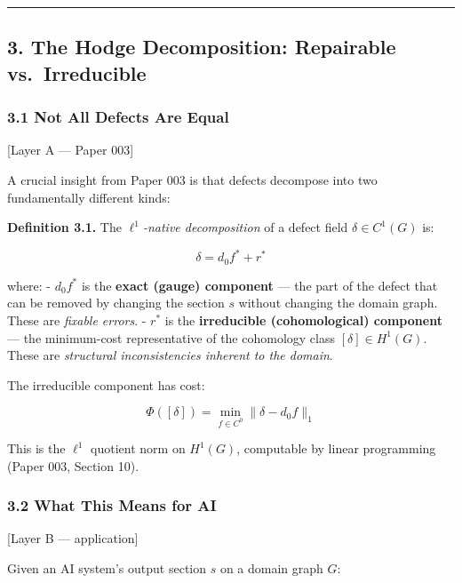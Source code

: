 \documentclass[
]{article}
\begin{document}
\begin{center}\rule{0.5\linewidth}{0.5pt}\end{center}

\subsection{3. The Hodge Decomposition: Repairable
vs.~Irreducible}\label{the-hodge-decomposition-repairable-vs.-irreducible}

\subsubsection{3.1 Not All Defects Are
Equal}\label{not-all-defects-are-equal}

{[}Layer A --- Paper 003{]}

A crucial insight from Paper 003 is that defects decompose into two
fundamentally different kinds:

\textbf{Definition 3.1.} The \emph{\(\ell^1\)-native decomposition} of a
defect field \(\delta \in C^1(G)\) is:

\[\delta = d_0 f^* + r^*\]

where: - \(d_0 f^*\) is the \textbf{exact (gauge) component} --- the
part of the defect that can be removed by changing the section \(s\)
without changing the domain graph. These are \emph{fixable errors}. -
\(r^*\) is the \textbf{irreducible (cohomological) component} --- the
minimum-cost representative of the cohomology class
\([\delta] \in H^1(G)\). These are \emph{structural inconsistencies
inherent to the domain}.

The irreducible component has cost:

\[\Phi([\delta]) = \min_{f \in C^0} \|\delta - d_0 f\|_1\]

This is the \(\ell^1\) quotient norm on \(H^1(G)\), computable by linear
programming (Paper 003, Section 10).

\subsubsection{3.2 What This Means for AI}\label{what-this-means-for-ai}

{[}Layer B --- application{]}

Given an AI system's output section \(s\) on a domain graph \(G\):
\end{document}
